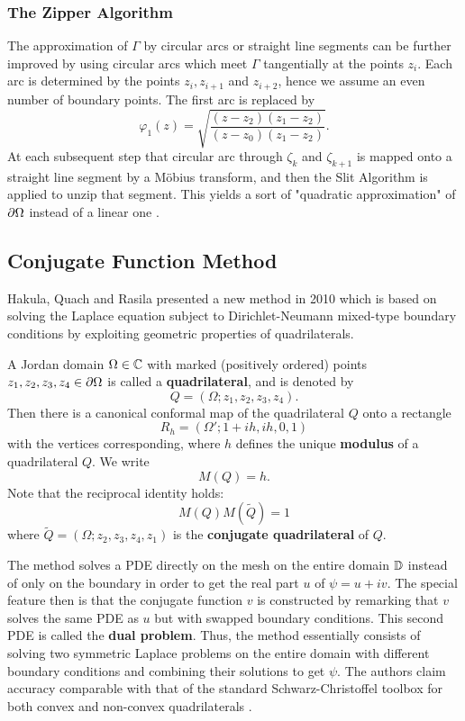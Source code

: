 \subsubsection{The Zipper Algorithm}
The approximation of $\Gamma$ by circular arcs or straight line segments can be further improved by using circular arcs which meet $\Gamma$ tangentially at the points $z_i$. Each arc is determined by the points $z_i, z_{i+1}$ and $z_{i+2}$, hence we assume an even number of boundary points. 
The first arc is replaced by $$\varphi_1(z)=\sqrt{\frac{(z-z_2)(z_1-z_2)}{(z-z_0)(z_1-z_2)}}.$$ At each subsequent step that circular arc through $\zeta_k$ and $\zeta_{k+1}$ is mapped onto a straight line segment by a Möbius transform, and then the Slit Algorithm is applied to unzip that segment.
This yields a sort of "quadratic approximation" of $\partial\Omega$ instead of a linear one \cite[page 8]{marshall2006_convergencezipperalgorithmconformal}.

\subsection{Conjugate Function Method } \label{chap:ConjugateFunctionMethod}
Hakula, Quach and Rasila \cite{Hakula_2013_conjugatefunctionmethod} presented a new method in 2010 which is based on solving the Laplace equation subject to Dirichlet-Neumann mixed-type boundary conditions by exploiting geometric properties of quadrilaterals.  
\begin{definition}
    A Jordan domain $\Omega\in\mathbb{C}$ with marked (positively ordered) points $z_1 , z_2 , z_3 , z_4 \in \partial\Omega$ is called a \textbf{quadrilateral}, and is denoted by $$Q = (\Omega; z_1 , z_2 , z_3 , z_4 ).$$ 
    Then there is a canonical conformal map of the quadrilateral $Q$ onto a rectangle $$R_h = (\Omega ' ; 1 + ih, ih, 0, 1)$$ with the vertices corresponding, where $h$ defines the unique \textbf{modulus} of a quadrilateral $Q$. 
    We write $$M(Q) = h.$$
    Note that the reciprocal identity holds:
    \begin{equation}
        M(Q)M(\tilde{Q}) = 1
    \end{equation} 
    where $\tilde{Q} = (\Omega; z_2 , z_3 , z_4 , z_1 )$ is the \textbf{conjugate quadrilateral} of $Q$.
\end{definition}
The method solves a PDE directly on the mesh on the entire domain $\mathbb{D}$ instead of only on the boundary in order to get the real part $u$ of $\psi=u+iv$. The special feature then is that the conjugate function $v$ is constructed by remarking that $v$ solves the same PDE as $u$ but with swapped boundary conditions. 
This second PDE is called the \textbf{dual problem}.
Thus, the method essentially consists of solving two symmetric Laplace problems on the entire domain with different boundary conditions and combining their solutions to get $\psi$.
The authors claim accuracy comparable with that of the standard Schwarz-Christoffel toolbox for both convex and non-convex quadrilaterals \cite[Figure 5]{Hakula_2013_conjugatefunctionmethod}.

